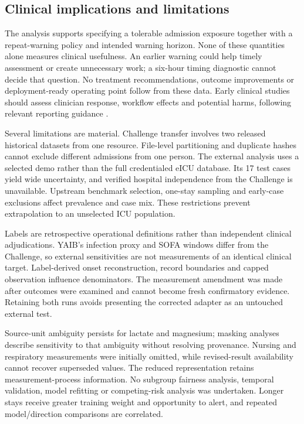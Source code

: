\documentclass[preprint,12pt]{elsarticle}
\begin{document}
\subsection{Clinical implications and limitations}
The analysis supports specifying a tolerable admission exposure together with a repeat-warning policy and intended warning horizon. None of these quantities alone measures clinical usefulness. An earlier warning could help timely assessment or create unnecessary work; a six-hour timing diagnostic cannot decide that question. No treatment recommendations, outcome improvements or deployment-ready operating point follow from these data. Early clinical studies should assess clinician response, workflow effects and potential harms, following relevant reporting guidance \cite{decideai}.

Several limitations are material. Challenge transfer involves two released historical datasets from one resource. File-level partitioning and duplicate hashes cannot exclude different admissions from one person. The external analysis uses a selected demo rather than the full credentialed eICU database. Its 17 test cases yield wide uncertainty, and verified hospital independence from the Challenge is unavailable. Upstream benchmark selection, one-stay sampling and early-case exclusions affect prevalence and case mix. These restrictions prevent extrapolation to an unselected ICU population.

Labels are retrospective operational definitions rather than independent clinical adjudications. YAIB's infection proxy and SOFA windows differ from the Challenge, so external sensitivities are not measurements of an identical clinical target. Label-derived onset reconstruction, record boundaries and capped observation influence denominators. The measurement amendment was made after outcomes were examined and cannot become fresh confirmatory evidence. Retaining both runs avoids presenting the corrected adapter as an untouched external test.

Source-unit ambiguity persists for lactate and magnesium; masking analyses describe sensitivity to that ambiguity without resolving provenance. Nursing and respiratory measurements were initially omitted, while revised-result availability cannot recover superseded values. The reduced representation retains measurement-process information. No subgroup fairness analysis, temporal validation, model refitting or competing-risk analysis was undertaken. Longer stays receive greater training weight and opportunity to alert, and repeated model/direction comparisons are correlated.
\end{document}
